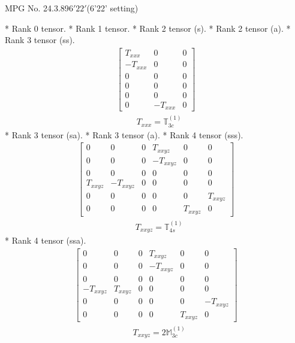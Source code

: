 \documentclass[fleqn,8pt,landscape]{jsarticle}
\begin{document}
\setcounter{MaxMatrixCols}{32}

\renewcommand{\tablename}{Table~}
\renewcommand{\figurename}{Figure~}
\begin{center}
\LARGE
MPG No. 24.3.89\quad$6'22'$\quad(6'22' setting)
\end{center}
* Rank 0 tensor.
* Rank 1 tensor.
* Rank 2 tensor (s).
* Rank 2 tensor (a).
* Rank 3 tensor (ss).
\begin{align*}
\begin{bmatrix} T_{xxx} & 0 & 0 \\ - T_{xxx} & 0 & 0 \\ 0 & 0 & 0 \\ 0 & 0 & 0 \\ 0 & 0 & 0 \\ 0 & - T_{xxx} & 0 \end{bmatrix}
\end{align*}
\begin{align*}
& T_{xxx} = \mathbb{T}_{3c}^{(1)}
\end{align*}
* Rank 3 tensor (sa).
* Rank 3 tensor (a).
* Rank 4 tensor (sss).
\begin{align*}
\begin{bmatrix} 0 & 0 & 0 & T_{xxyz} & 0 & 0 \\ 0 & 0 & 0 & - T_{xxyz} & 0 & 0 \\ 0 & 0 & 0 & 0 & 0 & 0 \\ T_{xxyz} & - T_{xxyz} & 0 & 0 & 0 & 0 \\ 0 & 0 & 0 & 0 & 0 & T_{xxyz} \\ 0 & 0 & 0 & 0 & T_{xxyz} & 0 \end{bmatrix}
\end{align*}
\begin{align*}
& T_{xxyz} = \mathbb{T}_{4s}^{(1)}
\end{align*}
* Rank 4 tensor (ssa).
\begin{align*}
\begin{bmatrix} 0 & 0 & 0 & T_{xxyz} & 0 & 0 \\ 0 & 0 & 0 & - T_{xxyz} & 0 & 0 \\ 0 & 0 & 0 & 0 & 0 & 0 \\ - T_{xxyz} & T_{xxyz} & 0 & 0 & 0 & 0 \\ 0 & 0 & 0 & 0 & 0 & - T_{xxyz} \\ 0 & 0 & 0 & 0 & T_{xxyz} & 0 \end{bmatrix}
\end{align*}
\begin{align*}
& T_{xxyz} = 2 \mathbb{M}_{3c}^{(1)}
\end{align*}
\end{document}
